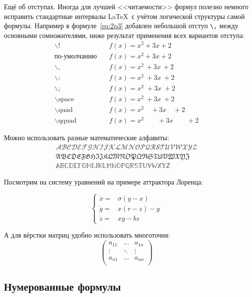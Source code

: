 Ещё об отступах. Иногда для лучшей <<читаемости>> формул полезно
немного исправить стандартные интервалы \LaTeX\ с учётом логической
структуры самой формулы. Например в формуле~\ref{eq:2p3} добавлен
небольшой отступ \verb+\,+ между основными сомножителями, ниже
результат применения всех вариантов отступа:
\begin{align*}
\backslash! &\quad f(x) = x^2\! +3x\! +2 \\
  \mbox{по-умолчанию} &\quad f(x) = x^2+3x+2 \\
\backslash, &\quad f(x) = x^2\, +3x\, +2 \\
\backslash{:} &\quad f(x) = x^2\: +3x\: +2 \\
\backslash; &\quad f(x) = x^2\; +3x\; +2 \\
\backslash \mbox{space} &\quad f(x) = x^2\ +3x\ +2 \\
\backslash \mbox{quad} &\quad f(x) = x^2\quad +3x\quad +2 \\
\backslash \mbox{qquad} &\quad f(x) = x^2\qquad +3x\qquad +2
\end{align*}


Можно использовать разные математические алфавиты:
\begin{align}
\mathcal{ABCDEFGHIJKLMNOPQRSTUVWXYZ} \nonumber \\
\mathfrak{ABCDEFGHIJKLMNOPQRSTUVWXYZ} \nonumber \\
\mathbb{ABCDEFGHIJKLMNOPQRSTUVWXYZ} \nonumber
\end{align}

Посмотрим на систему уравнений на примере аттрактора Лоренца:

\[
\left\{
  \begin{array}{rl}
    \dot x = & \sigma (y-x) \\
    \dot y = & x (r - z) - y \\
    \dot z = & xy - bz
  \end{array}
\right.
\]

А для вёрстки матриц удобно использовать многоточия:
\[
\left(
  \begin{array}{ccc}
    a_{11} & \ldots & a_{1n} \\
    \vdots & \ddots & \vdots \\
    a_{n1} & \ldots & a_{nn} \\
  \end{array}
\right)
\]


\subsection{Нумерованные формулы} \label{subsect1_3_3}


